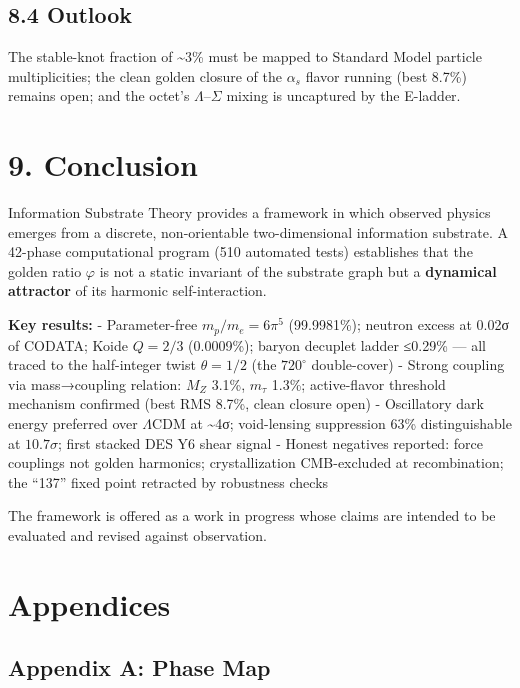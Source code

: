 \documentclass[
  11pt,
]{article}
\begin{document}
\subsection{8.4 Outlook}\label{outlook}

The stable-knot fraction of \textasciitilde3\% must be mapped to
Standard Model particle multiplicities; the clean golden closure of the
\(\alpha_s\) flavor running (best 8.7\%) remains open; and the octet's
\(\Lambda\)--\(\Sigma\) mixing is uncaptured by the E-ladder.

\section{9. Conclusion}\label{conclusion}

Information Substrate Theory provides a framework in which observed
physics emerges from a discrete, non-orientable two-dimensional
information substrate. A 42-phase computational program (510 automated
tests) establishes that the golden ratio \(\varphi\) is not a static
invariant of the substrate graph but a \textbf{dynamical attractor} of
its harmonic self-interaction.

\textbf{Key results:} - Parameter-free \(m_p/m_e = 6\pi^5\) (99.9981\%);
neutron excess at 0.02σ of CODATA; Koide \(Q = 2/3\) (0.0009\%); baryon
decuplet ladder ≤0.29\% --- all traced to the half-integer twist
\(\theta = 1/2\) (the \(720^{\circ}\) double-cover) - Strong coupling
via mass→coupling relation: \(M_Z\) 3.1\%, \(m_\tau\) 1.3\%;
active-flavor threshold mechanism confirmed (best RMS 8.7\%, clean
closure open) - Oscillatory dark energy preferred over \(\Lambda\)CDM at
\textasciitilde4σ; void-lensing suppression 63\% distinguishable at
\(10.7\sigma\); first stacked DES Y6 shear signal - Honest negatives
reported: force couplings not golden harmonics; crystallization
CMB-excluded at recombination; the ``137'' fixed point retracted by
robustness checks

The framework is offered as a work in progress whose claims are intended
to be evaluated and revised against observation.

\section{Appendices}\label{appendices}

\subsection{Appendix A: Phase Map}\label{appendix-a-phase-map}
\end{document}
